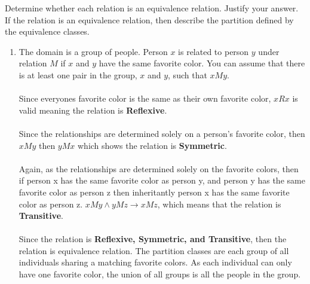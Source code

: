 \documentclass{amsart}
\theoremstyle{definition}
\theoremstyle{Exercise}
\theoremstyle{remark}
\theoremstyle{rule}
\numberwithin{equation}{section}
\begin{document}
Determine whether each relation is an equivalence relation. Justify your answer. If the relation is an equivalence relation, then describe the partition defined by the equivalence classes.\\
\begin{enumerate}[label=(\alph*)]
\item The domain is a group of people. Person $x$ is related to person $y$ under relation $M$ if $x$ and $y$ have the same favorite color. You can assume that there is at least one pair in the group, $x$ and $y$, such that $xMy$.\\\\
Since everyones favorite color is the same as their own favorite color, $xRx$ is valid meaning the relation is \textbf{Reflexive}.\\\\
Since the relationships are determined solely on a person's favorite color, then $xMy$ then $yMx$ which shows the relation is \textbf{Symmetric}.\\\\
Again, as the relationships are determined solely on the favorite colors, then if person x has the same favorite color as person y, and person y has the same favorite color as person z then inheritantly person x has the same favorite color as person z.
$xMy \land yMz \rightarrow xMz$, which means that the relation is \textbf{Transitive}.\\\\
Since the relation is \textbf{Reflexive, Symmetric, and Transitive}, then the relation is equivalence relation. The partition classes are each group of all individuals sharing a matching favorite colors. As each individual can only have one favorite color, the union of all groups is all the people in the group.
\\\\


\end{enumerate}
\end{document}
